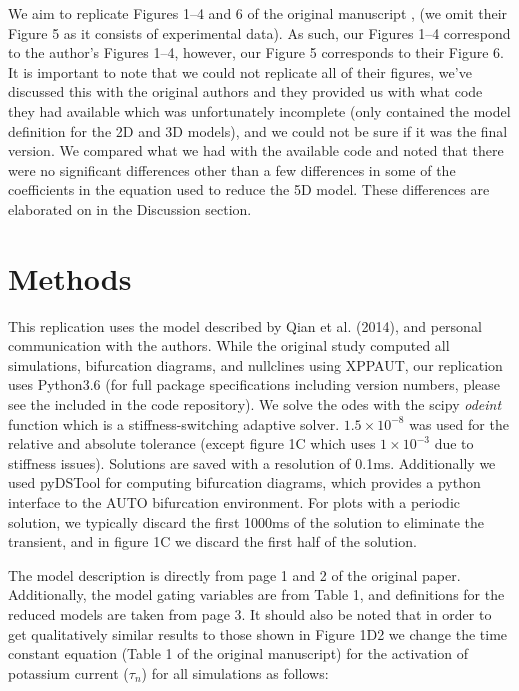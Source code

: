 We aim to replicate Figures 1--4 and 6 of the original manuscript \cite{Qian2014}, (we omit their Figure 5 as it consists of experimental data). As such, our Figures 1--4 correspond to the author's Figures 1--4, however, our Figure 5 corresponds to their Figure 6. It is important to note that we could not replicate all of their figures, we've discussed this with the original authors and they provided us with what code they had available which was unfortunately incomplete (only contained the model definition for the 2D and 3D models), and we could not be sure if it was the final version. We compared what we had with the available code and noted that there were no significant differences other than a few differences in some of the coefficients in the equation used to reduce the 5D model. These differences are elaborated on in the Discussion section.

\section{Methods}

This replication uses the model described by Qian et al. (2014), and personal communication with the authors. While the original study computed all simulations, bifurcation diagrams, and nullclines using XPPAUT, our replication uses Python3.6 (for full package specifications including version numbers, please see the included  in the code repository). We solve the odes with the scipy \emph{odeint} function which is a stiffness-switching adaptive solver. $1.5\times 10^{-8}$ was used for the relative and absolute tolerance (except figure 1C which uses $1\times 10^{-3}$ due to stiffness issues). Solutions are saved with a resolution of 0.1ms. Additionally we used pyDSTool \cite{pydstool} for computing bifurcation diagrams, which provides a python interface to the AUTO bifurcation environment. For plots with a periodic solution, we typically discard the first 1000ms of the solution to eliminate the transient, and in figure 1C we discard the first half of the solution. 

The model description is directly from page 1 and 2 of the original paper. Additionally, the model gating variables are from Table 1, and definitions for the reduced models are taken from page 3. It should also be noted that in order to get qualitatively similar results to those shown in Figure 1D2 we change the time constant equation (Table 1 of the original manuscript) for the activation of potassium current ($\tau_{n}$) for all simulations as follows:

